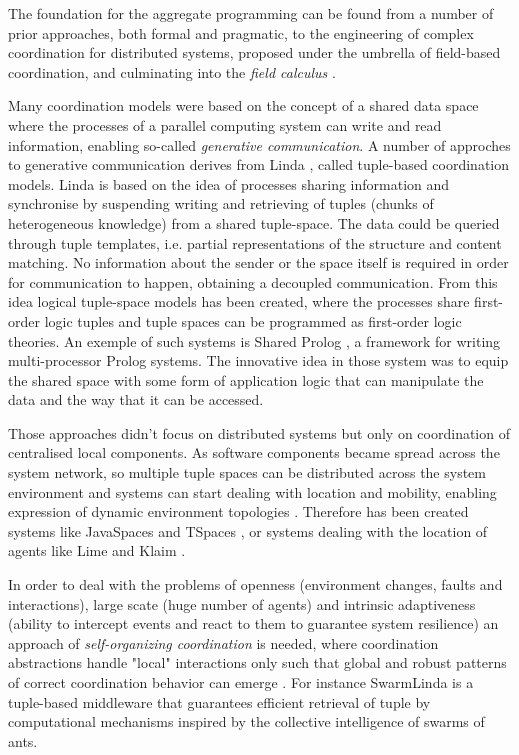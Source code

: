 The foundation for the aggregate programming can be found from a number of prior approaches, both formal and pragmatic, to the engineering of complex coordination for distributed systems, proposed under the umbrella of field-based coordination, and culminating into the \textit{field calculus} \cite{Survey}.

Many coordination models were based on the concept of a shared data space where the processes of a parallel computing system can write and read information, enabling so-called \textit{generative communication}. A number of approches to generative communication derives from Linda \cite{Linda}, called tuple-based coordination models. Linda is based on the idea of processes sharing information and synchronise by suspending writing and retrieving of tuples (chunks of heterogeneous knowledge) from a shared tuple-space. The data could be queried through tuple templates, i.e. partial representations of the structure and content matching. No information about the sender or the space itself is required in order for communication to happen, obtaining a decoupled communication. From this idea logical tuple-space models has been created, where the processes share first-order logic tuples and tuple spaces can be programmed as first-order logic theories. An exemple of such systems is Shared Prolog \cite{SharedProlog}, a framework for writing multi-processor Prolog systems. The innovative idea in those system was to equip the shared space with some form of application logic that can manipulate the data and the way that it can be accessed.

Those approaches didn't focus on distributed systems but only on coordination of centralised local components. As software components became spread across the system network, so multiple tuple spaces can be distributed across the system environment and systems can start dealing with location and mobility, enabling expression of dynamic environment topologies \cite{Survey}. Therefore has been created systems like JavaSpaces \cite{freeman1999javaspaces} and TSpaces \cite{TSapces}, or systems dealing with the location of agents like Lime \cite{Lime} and Klaim \cite{Klaim}.

In order to deal with the problems of openness (environment changes, faults and interactions), large scate (huge number of agents) and intrinsic adaptiveness (ability to intercept events and react to them to guarantee system resilience) an approach of \textit{self-organizing coordination} is needed, where coordination abstractions handle "local" interactions only such that global and robust patterns of correct coordination behavior can emerge \cite{Survey}. For instance SwarmLinda \cite{SwarmLinda} is a tuple-based middleware that guarantees efficient retrieval of tuple by computational mechanisms inspired by the collective intelligence of swarms of ants.

